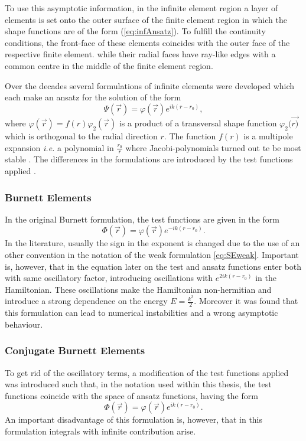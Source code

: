 To use this asymptotic information, in the infinite element region a layer of elements is set onto the outer surface of the finite element region in which the shape functions are of the form (\ref{eq:infAnsatz}).
To fulfill the continuity conditions, the front-face of these elements coincides with the outer face of the respective finite element. while their radial faces have ray-like edges with a common centre in the middle of the finite element region.

Over the decades several formulations of infinite elements were developed which each make an ansatz for the solution of the form
\begin{equation} \label{eq:Infansatz}
 \Psi(\vec{r}) = \varphi(\vec{r}) e^{ik(r-r_0)},
\end{equation}
where $\varphi(\vec{r})=f(r)\varphi_2(\vec{r})$ is a product of a transversal shape function $\varphi_2(\vec{r)}$ which is orthogonal to the radial direction $r$.
The function $f(r)$ is a multipole expansion \textit{i.e.} a polynomial in $\frac{r_0}{r}$ where Jacobi-polynomials turned out te be most stable \cite{dreyer_improved}.
The differences in the formulations are introduced by the test functions applied \cite{Astley}.

\subsubsection{Burnett Elements}
In the original Burnett formulation, the test functions are given in the form
\begin{equation} \label{eq:ALelem}
 \Phi(\vec{r}) = \varphi(\vec{r}) e^{-ik(r-r_0)}.
\end{equation}
In the literature, usually the sign in the exponent is changed due to the use of an other convention in the notation of the weak formulation \ref{eq:SEweak}.
Important is, however, that in the equation later on the test and ansatz functions enter both with same oscillatory factor, introducing oscillations with $e^{2ik(r-r_0)}$ in the Hamiltonian.
These oscillations make the Hamiltonian non-hermitian and introduce a strong dependence on the energy $E=\frac{k^2}{2}$.
Moreover it was found that this formulation can lead to numerical instabilities \cite{Astley} and a wrong asymptotic behaviour.

\subsubsection{Conjugate Burnett Elements}
To get rid of the oscillatory terms, a modification of the test functions applied was introduced such that, in the notation used within this thesis, the test functions coincide with the space of ansatz functions, having the form
\begin{equation}
 \Phi(\vec{r}) = \varphi(\vec{r}) e^{ik(r-r_0)}.
\end{equation}
An important disadvantage of this formulation is, however, that in this formulation integrals with infinite contribution arise.

